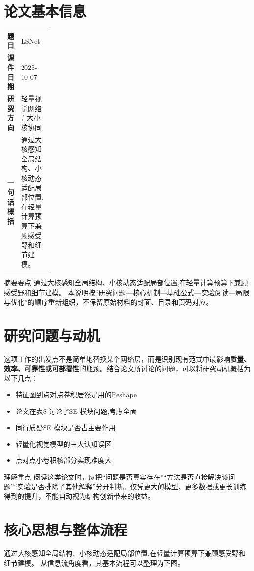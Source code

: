 \documentclass[UTF8,11pt,a4paper]{ctexart}
\newcommand{\term}[1]{\textbf{\textcolor{mainblue}{#1}}}
\begin{document}
\section{论文基本信息}
\begin{center}
\begin{tabularx}{0.94\linewidth}{>{\bfseries}p{0.18\linewidth}X}
\toprule
题目 & LSNet\\
课件日期 & 2025-10-07\\
研究方向 & 轻量视觉网络 / 大小核协同\\
一句话概括 & 通过大核感知全局结构、小核动态适配局部位置,在轻量计算预算下兼顾感受野和细节建模。\\
\bottomrule
\end{tabularx}
\end{center}

\begin{infobox}{摘要要点}
通过大核感知全局结构、小核动态适配局部位置,在轻量计算预算下兼顾感受野和细节建模。 本说明按“研究问题—核心机制—基础公式—实验阅读—局限与优化”的顺序重新组织，不保留原始材料的封面、目录和页码对应。
\end{infobox}

\section{研究问题与动机}
这项工作的出发点不是简单地替换某个网络层，而是识别现有范式中最影响\term{质量、效率、可靠性或可部署性}的瓶颈。结合论文所讨论的问题，可以将研究动机概括为以下几点：
\begin{itemize}
\item 特征图到点对点卷积居然是用的Reshape
\item 论文在表8 讨论了SE 模块问题,考虑全面
\item 同行质疑SE 模块是否占主要作用
\item 轻量化视觉模型的三大认知误区
\item 点对点小卷积核部分实现难度大
\end{itemize}

\begin{notebox}{理解重点}
阅读这类论文时，应把“问题是否真实存在”“方法是否直接解决该问题”“实验是否排除了其他解释”分开判断。仅凭更大的模型、更多数据或更长训练得到的提升，不能自动视为结构创新带来的收益。
\end{notebox}

\section{核心思想与整体流程}
通过大核感知全局结构、小核动态适配局部位置,在轻量计算预算下兼顾感受野和细节建模。 从信息流角度看，其基本流程可以整理为下图。
\end{document}
